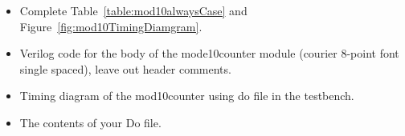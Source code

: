 \begin{itemize}
\item
  Complete Table~\ref{table:mod10alwaysCase} and Figure~\ref{fig:mod10TimingDiamgram}.
\item
  Verilog code for the body of the mode10counter module (courier 8-point
  font single spaced), leave out header comments.
\item
  Timing diagram of the mod10counter using do file in the testbench.
\item
  The contents of your Do file.
\end{itemize}


